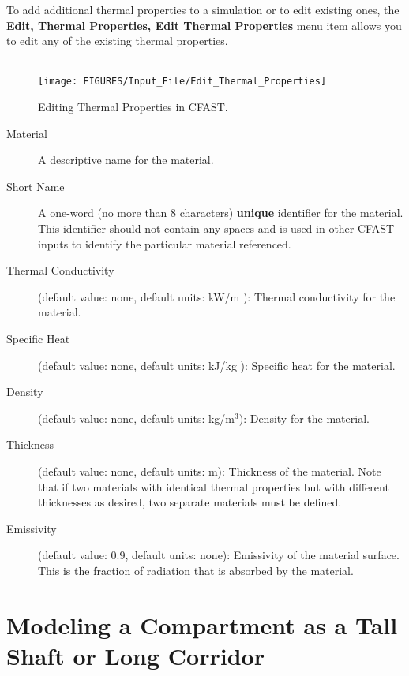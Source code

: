 To add additional thermal properties to a simulation or to edit existing ones, the \textbf{Edit, Thermal Properties, Edit Thermal Properties} menu item allows you to edit any of the existing thermal properties. \\~ \\

\begin{figure}[h!]
\begin{center}
\texttt{[image: FIGURES/Input\_File/Edit\_Thermal\_Properties]}
\caption[Editing Thermal Properties in CFAST]{Editing Thermal Properties in CFAST.}
\end{center}
\end{figure}

\begin{description}
\item[Material] A descriptive name for the material.

\item[Short Name] A one-word (no more than 8 characters) \textbf{unique} identifier for the material.  This identifier should not contain any spaces and is used in other CFAST inputs to identify the particular material referenced.

\item[Thermal Conductivity] (default value: none, default units: kW/m \degc): Thermal conductivity for the material.

\item[Specific Heat] (default value: none, default units: kJ/kg \degc): Specific heat for the material.

\item[Density] (default value: none, default units: kg/m$^3$): Density for the material.

\item[Thickness] (default value: none, default units: m): Thickness of the material.  Note that if two materials with identical thermal properties but with different thicknesses as desired, two separate materials must be defined.

\item[Emissivity] (default value: 0.9, default units: none): Emissivity of the material surface.  This is the fraction of radiation that is absorbed by the material.
\end{description}


\section{Modeling a Compartment as a Tall Shaft or Long Corridor}

